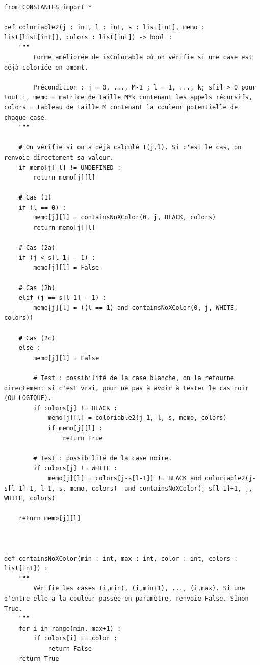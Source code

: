 \documentclass[a4paper,12pt]{article}
\begin{document}
\begin{lstlisting}
from CONSTANTES import *

def coloriable2(j : int, l : int, s : list[int], memo : list[list[int]], colors : list[int]) -> bool :
    """
        Forme améliorée de isColorable où on vérifie si une case est déjà coloriée en amont.
    
        Précondition : j = 0, ..., M-1 ; l = 1, ..., k; s[i] > 0 pour tout i, memo = matrice de taille M*k contenant les appels récursifs, colors = tableau de taille M contenant la couleur potentielle de chaque case.
    """
        
    # On vérifie si on a déjà calculé T(j,l). Si c'est le cas, on renvoie directement sa valeur.
    if memo[j][l] != UNDEFINED :
        return memo[j][l]
    
    # Cas (1)
    if (l == 0) :
        memo[j][l] = containsNoXColor(0, j, BLACK, colors)
        return memo[j][l]

    # Cas (2a)
    if (j < s[l-1] - 1) :
        memo[j][l] = False
        
    # Cas (2b)
    elif (j == s[l-1] - 1) :
        memo[j][l] = ((l == 1) and containsNoXColor(0, j, WHITE, colors))
    
    # Cas (2c)  
    else :
        memo[j][l] = False
        
        # Test : possibilité de la case blanche, on la retourne directement si c'est vrai, pour ne pas à avoir à tester le cas noir (OU LOGIQUE).
        if colors[j] != BLACK :
            memo[j][l] = coloriable2(j-1, l, s, memo, colors)
            if memo[j][l] :
                return True
        
        # Test : possibilité de la case noire.
        if colors[j] != WHITE :
            memo[j][l] = colors[j-s[l-1]] != BLACK and coloriable2(j-s[l-1]-1, l-1, s, memo, colors)  and containsNoXColor(j-s[l-1]+1, j, WHITE, colors)
            
    return memo[j][l]



def containsNoXColor(min : int, max : int, color : int, colors : list[int]) :
    """
        Vérifie les cases (i,min), (i,min+1), ..., (i,max). Si une d'entre elle a la couleur passée en paramètre, renvoie False. Sinon True.
    """
    for i in range(min, max+1) :
        if colors[i] == color :
            return False
    return True

\end{lstlisting}
\end{document}
